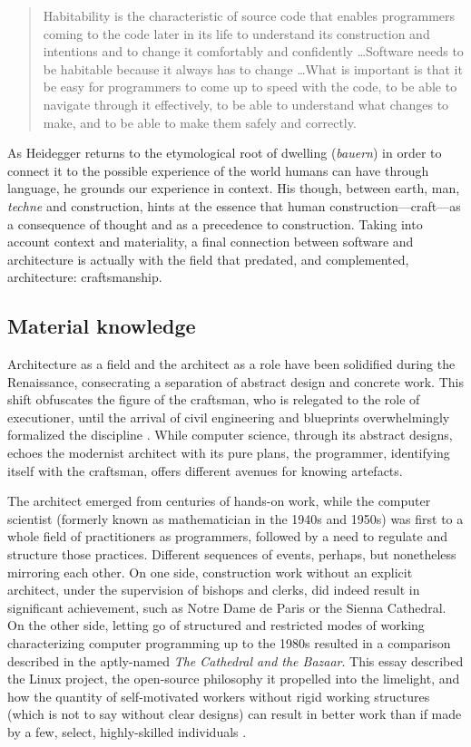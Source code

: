 \begin{quote}
    Habitability is the characteristic of source code that enables programmers coming to the code later in its life to understand its construction and intentions and to change it comfortably and confidently \dots Software needs to be habitable because it always has to change \dots What is important is that it be easy for programmers to come up to speed with the code, to be able to navigate through it effectively, to be able to understand what changes to make, and to be able to make them safely and correctly. \citep{gabriel_patterns_1998}
\end{quote}

As Heidegger returns to the etymological root of dwelling (\emph{bauern}) in order to connect it to the possible experience of the world humans can have through language, he grounds our experience in context. His though, between earth, man, \emph{techne} and construction, hints at the essence that human construction—craft—as a consequence of thought and as a precedence to construction. Taking into account context and materiality, a final connection between software and architecture is actually with the field that predated, and complemented, architecture: craftsmanship.

\subsection{Material knowledge}
\label{subsec:material-knoweldge}

Architecture as a field and the architect as a role have been solidified during the Renaissance, consecrating a separation of abstract design and concrete work. This shift obfuscates the figure of the craftsman, who is relegated to the role of executioner, until the arrival of civil engineering and blueprints overwhelmingly formalized the discipline \citep{pevsner_term_1942}. While computer science, through its abstract designs, echoes the modernist architect with its pure plans, the programmer, identifying itself with the craftsman, offers different avenues for knowing artefacts.

The architect emerged from centuries of hands-on work, while the computer scientist (formerly known as mathematician in the 1940s and 1950s) was first to a whole field of practitioners as programmers, followed by a need to regulate and structure those practices. Different sequences of events, perhaps, but nonetheless mirroring each other. On one side, construction work without an explicit architect, under the supervision of bishops and clerks, did indeed result in significant achievement, such as Notre Dame de Paris or the Sienna Cathedral. On the other side, letting go of structured and restricted modes of working characterizing computer programming up to the 1980s resulted in a comparison described in the aptly-named \emph{The Cathedral and the Bazaar}. This essay described the Linux project, the open-source philosophy it propelled into the limelight, and how the quantity of self-motivated workers without rigid working structures (which is not to say without clear designs) can result in better work than if made by a few, select, highly-skilled individuals \citep{raymond_cathedral_2001,henningsen_joys_2020}.

